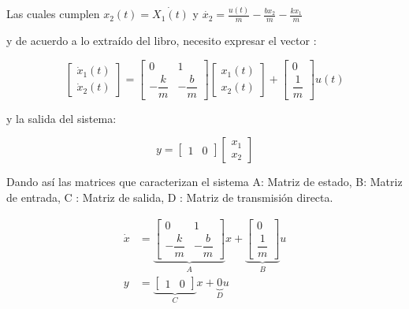 \documentclass[a4paper]{article}
\begin{document}
Las cuales cumplen $ x_2(t) = \dot{X_1(t)} $ y $\dot{x_2} = \frac{u(t) }{m} - \frac{b x_2}{m} - \frac{k x_1}{m}$



y de acuerdo a lo extraído del libro, necesito expresar el vector :

\begin{equation}
	\begin{bmatrix}
		\dot{x}_1(t) \\
		\dot{x}_2(t)
	\end{bmatrix}
	=
	\begin{bmatrix}
		0 & 1 \\
		-\dfrac{k}{m} & -\dfrac{b}{m}
	\end{bmatrix}
	\begin{bmatrix}
		x_1(t) \\
		x_2(t)
	\end{bmatrix}
	+
	\begin{bmatrix}
		0 \\
		\dfrac{1}{m}
	\end{bmatrix}
	u(t)
\end{equation}

y la salida del sistema:

\begin{equation}
	y =
	\begin{bmatrix}
		1 & 0
	\end{bmatrix}
	\begin{bmatrix}
		x_1 \\
		x_2
	\end{bmatrix}
\end{equation}


Dando así las matrices que caracterizan el sistema A: Matriz de estado, B: Matriz de entrada, C : Matriz de salida, D : Matriz de transmisión directa.

\begin{equation}
	\begin{aligned}
		\dot{x} &= 
		\underbrace{
			\begin{bmatrix}
				0 & 1 \\
				-\dfrac{k}{m} & -\dfrac{b}{m}
		\end{bmatrix}}_{A}
		x
		+
		\underbrace{
			\begin{bmatrix}
				0 \\
				\dfrac{1}{m}
		\end{bmatrix}}_{B}
		u \\[6pt]
		y &=
		\underbrace{
			\begin{bmatrix}
				1 & 0
		\end{bmatrix}}_{C}
		x
		+
		\underbrace{0}_{D}u
	\end{aligned}
\end{equation}
\end{document}
